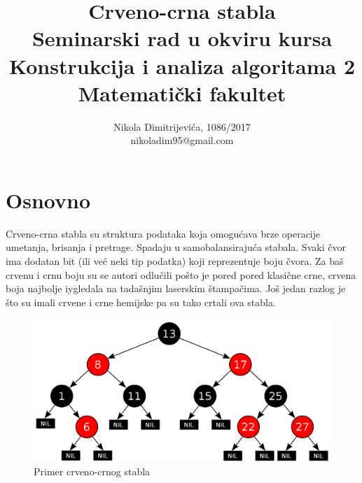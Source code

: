 \documentclass[a4paper]{article}
\begin{document}
\title{Crveno-crna stabla\\ \small{Seminarski rad u okviru kursa\\Konstrukcija i analiza algoritama 2\\ Matematički fakultet}}

\author{Nikola Dimitrijevića, 1086/2017\\ nikoladim95@gmail.com}
\maketitle


\tableofcontents

\newpage

\section{Osnovno}
\label{sec:uvod}
Crveno-crna stabla su struktura podataka koja omogućava brze operacije umetanja, brisanja i pretrage. Spadaju u samobalansirajuća stabala.
Svaki čvor ima dodatan bit (ili već neki tip podatka) koji reprezentuje boju čvora. Za baš crvenu i crnu boju su se autori odlučili pošto je pored pored klasične crne,
crvena boja najbolje iygledala na tadašnjim laserskim štampačima. Još jedan razlog je što su imali crvene i crne hemijske pa su tako crtali ova stabla.

\begin{figure}[h!]
\begin{center}
\includegraphics[scale=0.2]{example.png}
\end{center}
\caption{Primer crveno-crnog stabla}
\label{fig:primer}
\end{figure}
\end{document}
